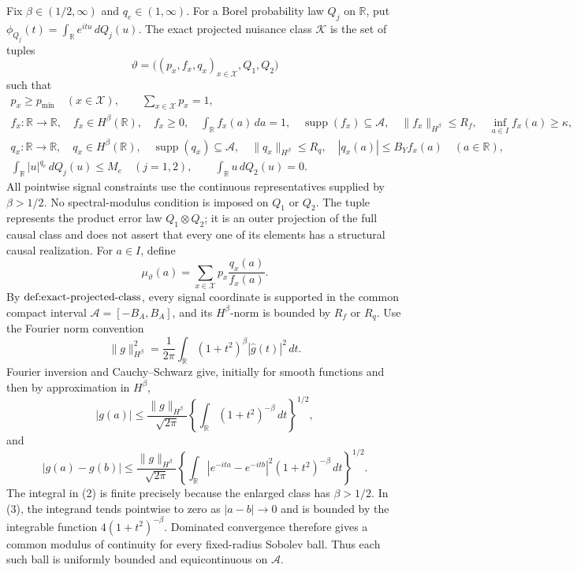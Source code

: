 Fix \(\beta\in(1/2,\infty)\) and \(q_e\in(1,\infty)\).  For a Borel
probability law \(Q_j\) on \(\mathbb R\), put
\(\phi_{Q_j}(t)=\int_{\mathbb R}e^{itu}\,dQ_j(u)\).  The exact projected
nuisance class \(\mathscr K\) is the set of tuples
\[
 \vartheta=\bigl((p_x,f_x,q_x)_{x\in\mathcal X},Q_1,Q_2\bigr)
\]
such that
\[
 \begin{gathered}
 p_x\ge p_{\min}\quad(x\in\mathcal X),\qquad
 \sum_{x\in\mathcal X}p_x=1,\\
 f_x:\mathbb R\to\mathbb R,\quad f_x\in H^\beta(\mathbb R),\quad f_x\ge0,\quad
 \int_{\mathbb R}f_x(a)\,da=1,\quad
 \operatorname{supp}(f_x)\subseteq\mathcal A,\quad
 \|f_x\|_{H^\beta}\le R_f,\quad
 \inf_{a\in I}f_x(a)\ge\kappa,\\
 q_x:\mathbb R\to\mathbb R,\quad q_x\in H^\beta(\mathbb R),\quad
 \operatorname{supp}(q_x)\subseteq\mathcal A,\quad
 \|q_x\|_{H^\beta}\le R_q,\quad
 |q_x(a)|\le B_Yf_x(a)\quad(a\in\mathbb R),\\
 \int_{\mathbb R}|u|^{q_e}\,dQ_j(u)\le M_e\quad(j=1,2),\qquad
 \int_{\mathbb R}u\,dQ_2(u)=0.
 \end{gathered}
\]
All pointwise signal constraints use the continuous representatives supplied by
\(\beta>1/2\).  No spectral-modulus condition is imposed on \(Q_1\) or
\(Q_2\).  The tuple represents the product error law \(Q_1\otimes Q_2\); it
is an outer projection of the full causal class and does not assert that every
one of its elements has a structural causal realization.  For \(a\in I\),
define
\[
 \mu_\vartheta(a)=\sum_{x\in\mathcal X}p_x\frac{q_x(a)}{f_x(a)}.
\]
By \(\textnormal{def:exact-projected-class}\), every signal coordinate is
supported in the common compact interval
\(\mathcal A=[-B_A,B_A]\), and its \(H^\beta\)-norm is bounded by \(R_f\)
or \(R_q\).  Use the Fourier norm convention
\[
 \|g\|_{H^\beta}^2
 =\frac{1}{2\pi}\int_{\mathbb R}(1+t^2)^\beta
       |\widehat g(t)|^2\,dt.                                      \tag{1}
\]
Fourier inversion and Cauchy--Schwarz give, initially for smooth functions and
then by approximation in \(H^\beta\),
\[
 |g(a)|
 \le \frac{\|g\|_{H^\beta}}{\sqrt{2\pi}}
       \left\{\int_{\mathbb R}(1+t^2)^{-\beta}\,dt\right\}^{1/2}, \tag{2}
\]
and
\[
 |g(a)-g(b)|
 \le \frac{\|g\|_{H^\beta}}{\sqrt{2\pi}}
 \left\{\int_{\mathbb R}|e^{-ita}-e^{-itb}|^2
                 (1+t^2)^{-\beta}\,dt\right\}^{1/2}.             \tag{3}
\]
The integral in (2) is finite precisely because the enlarged class has
\(\beta>1/2\).  In (3), the integrand tends pointwise to zero as
\(|a-b|\to0\) and is bounded by the integrable function
\(4(1+t^2)^{-\beta}\).  Dominated convergence therefore gives a common
modulus of continuity for every fixed-radius Sobolev ball.  Thus each such
ball is uniformly bounded and equicontinuous on \(\mathcal A\).

